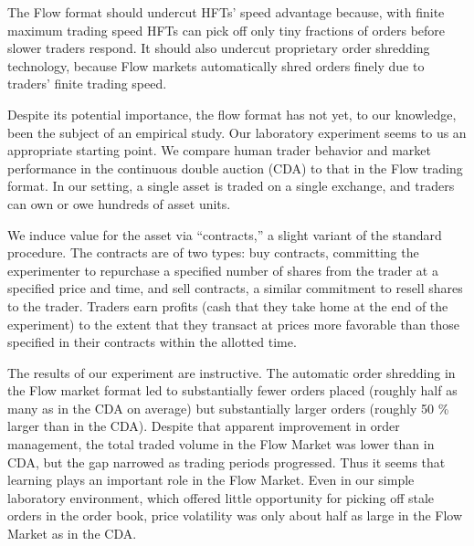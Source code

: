 The Flow format should undercut HFTs' speed advantage because, with finite maximum trading speed HFTs can pick off only tiny fractions of orders before slower traders respond. 
It should also undercut proprietary order shredding technology, because Flow markets automatically shred orders finely due to traders' finite trading speed. 

Despite its potential importance, the flow format has not yet, to our knowledge, been the subject of an empirical study. 
Our laboratory experiment seems to us an appropriate starting point. 
We compare human trader behavior and market performance in the continuous double auction (CDA) to that in the  Flow trading format. In our setting, a single asset is traded on a single exchange, and traders can own or owe hundreds of asset units. 

We induce value for the asset via ``contracts,'' a slight variant of the standard procedure.  
The contracts are of two types: buy contracts, committing the experimenter to repurchase a specified number of shares from the trader at a specified price and time, and sell contracts, a similar commitment to resell shares to the trader. Traders earn profits (cash that they take home at the end of the experiment) to the extent that they transact at prices more favorable than those specified in their contracts within the allotted time.


The results of our experiment are instructive. The automatic order shredding in the Flow market format led to substantially fewer orders placed (roughly half as many as in the CDA on average) but substantially larger orders (roughly 50 \% larger than in the CDA). %
Despite that apparent improvement in order management, the total traded volume in the Flow Market was lower than in CDA, but the gap narrowed as trading periods progressed.
Thus it seems that learning plays an important role in the Flow Market. Even in our simple laboratory environment, which offered little opportunity for picking off stale orders in the order book, price volatility was only about half as large in the  Flow Market as in the CDA. 

